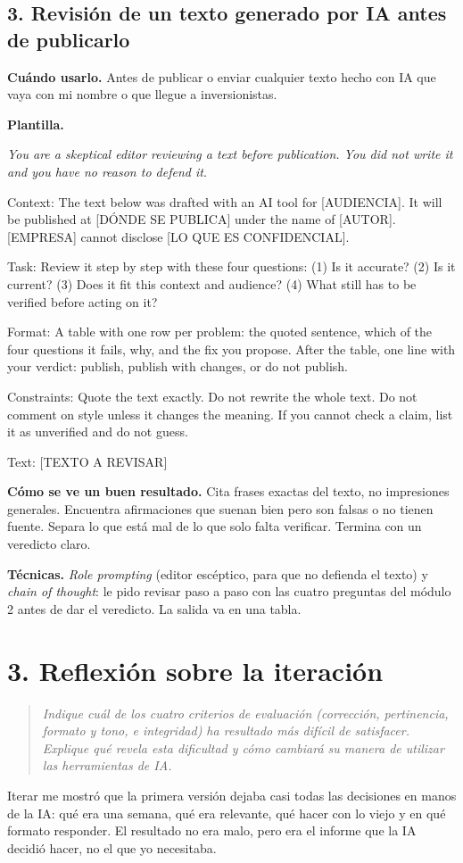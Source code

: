 \documentclass[11pt,letterpaper]{article}
\newcommand{\pregunta}[1]{%
  \begin{quote}\color{cGris}\small\itshape #1\end{quote}}
\newenvironment{prompt}{%
  \begin{center}\begin{minipage}{0.92\textwidth}\color{black!80}\small
  \setlength{\parskip}{0.4em}\itshape}{%
  \end{minipage}\end{center}}
\newcommand{\entrada}[5]{%
  \subsection*{#1}
  \textbf{Cuándo usarlo.} #2

  \textbf{Plantilla.}
  \begin{prompt}#3\end{prompt}

  \textbf{Cómo se ve un buen resultado.} #4

  \textbf{Técnicas.} #5}
\begin{document}
\entrada{3. Revisión de un texto generado por IA antes de publicarlo}
  {Antes de publicar o enviar cualquier texto hecho con IA que vaya con mi
  nombre o que llegue a inversionistas.}
  {You are a skeptical editor reviewing a text before publication. You did
  not write it and you have no reason to defend it.

  Context: The text below was drafted with an AI tool for [AUDIENCIA]. It
  will be published at [DÓNDE SE PUBLICA] under the name of [AUTOR].
  [EMPRESA] cannot disclose [LO QUE ES CONFIDENCIAL].

  Task: Review it step by step with these four questions: (1) Is it
  accurate? (2) Is it current? (3) Does it fit this context and audience?
  (4) What still has to be verified before acting on it?

  Format: A table with one row per problem: the quoted sentence, which of
  the four questions it fails, why, and the fix you propose. After the
  table, one line with your verdict: publish, publish with changes, or do
  not publish.

  Constraints: Quote the text exactly. Do not rewrite the whole text. Do
  not comment on style unless it changes the meaning. If you cannot check a
  claim, list it as unverified and do not guess.

  Text: [TEXTO A REVISAR]}
  {Cita frases exactas del texto, no impresiones generales. Encuentra
  afirmaciones que suenan bien pero son falsas o no tienen fuente. Separa
  lo que está mal de lo que solo falta verificar. Termina con un veredicto
  claro.}
  {\emph{Role prompting} (editor escéptico, para que no defienda el texto) y
  \emph{chain of thought}: le pido revisar paso a paso con las cuatro
  preguntas del módulo 2 antes de dar el veredicto. La salida va en una
  tabla.}

\section*{3. Reflexión sobre la iteración}

\pregunta{Indique cuál de los cuatro criterios de evaluación (corrección,
pertinencia, formato y tono, e integridad) ha resultado más difícil de
satisfacer. Explique qué revela esta dificultad y cómo cambiará su manera de
utilizar las herramientas de IA.}

Iterar me mostró que la primera versión dejaba casi todas las decisiones en
manos de la IA: qué era una semana, qué era relevante, qué hacer con lo
viejo y en qué formato responder. El resultado no era malo, pero era el
informe que la IA decidió hacer, no el que yo necesitaba.
\end{document}
